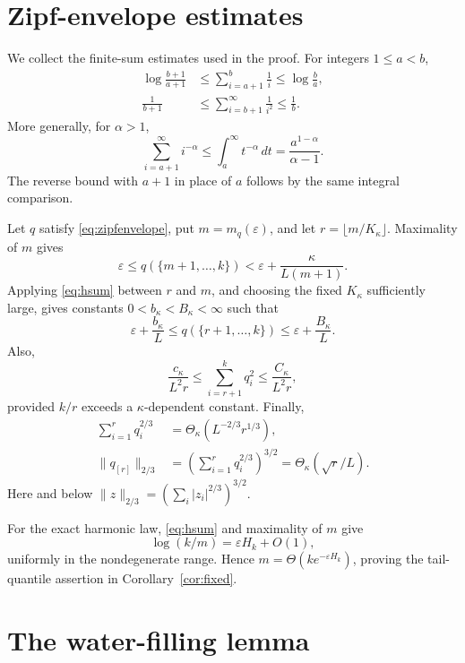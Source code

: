 \section{Zipf-envelope estimates}
\label{app:harmonic}

We collect the finite-sum estimates used in the proof. For integers
$1\leq a<b$,
\begin{align}
 \log\frac{b+1}{a+1}
 &\leq \sum_{i=a+1}^b\frac1i
 \leq \log\frac ba,                                      \tag{24}\label{eq:hsum}\\
 \frac{1}{b+1}
 &\leq \sum_{i=b+1}^{\infty}\frac1{i^2}
 \leq \frac1b.                                           \tag{25}\label{eq:squaresum}
\end{align}
More generally, for $\alpha>1$,
\[
 \sum_{i=a+1}^{\infty}i^{-\alpha}
 \leq \int_a^\infty t^{-\alpha}\,dt
 =\frac{a^{1-\alpha}}{\alpha-1}.                         \tag{26}\label{eq:pseries}
\]
The reverse bound with $a+1$ in place of $a$ follows by the same
integral comparison.

Let $q$ satisfy \eqref{eq:zipfenvelope}, put
$m=m_q(\varepsilon)$, and let $r=\lfloor m/K_\kappa\rfloor$. Maximality
of $m$ gives
\[
 \varepsilon\leq q(\{m+1,\ldots,k\})
 <\varepsilon+\frac{\kappa}{L(m+1)}.
\]
Applying \eqref{eq:hsum} between $r$ and $m$, and choosing the fixed
$K_\kappa$ sufficiently large, gives constants
$0<b_\kappa<B_\kappa<\infty$ such that
\[
 \varepsilon+\frac{b_\kappa}{L}
 \leq q(\{r+1,\ldots,k\})
 \leq \varepsilon+\frac{B_\kappa}{L}.                  \tag{27}\label{eq:tailmassbounds}
\]
Also,
\[
 \frac{c_\kappa}{L^2r}
 \leq\sum_{i=r+1}^kq_i^2
 \leq\frac{C_\kappa}{L^2r},                             \tag{28}\label{eq:tailcollisionbounds}
\]
provided $k/r$ exceeds a $\kappa$-dependent constant. Finally,
\begin{align}
 \sum_{i=1}^r q_i^{2/3}
 &=\Theta_\kappa(L^{-2/3}r^{1/3}),\nonumber\\
 \|q_{[r]}\|_{2/3}
 &=\left(\sum_{i=1}^r q_i^{2/3}\right)^{3/2}
 =\Theta_\kappa(\sqrt r/L).                             \tag{29}\label{eq:headnorm}
\end{align}
Here and below $\|z\|_{2/3}=(\sum_i|z_i|^{2/3})^{3/2}$.

For the exact harmonic law, \eqref{eq:hsum} and maximality of $m$ give
\[
 \log(k/m)=\varepsilon H_k+O(1),
\]
uniformly in the nondegenerate range. Hence
$m=\Theta(k e^{-\varepsilon H_k})$, proving the tail-quantile assertion
in Corollary~\ref{cor:fixed}.

\section{The water-filling lemma}
\label{app:waterfill}

